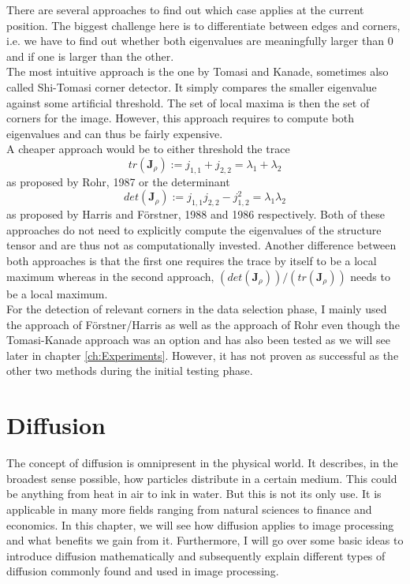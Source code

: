 There are several approaches to find out which case applies at the current position. The biggest
challenge here is to differentiate between edges and corners, i.e. we have to find out whether both
eigenvalues are meaningfully larger than 0 and if one is larger than the other.\\
The most intuitive approach is the one by Tomasi and Kanade, sometimes also called Shi-Tomasi
corner detector. It simply compares the smaller eigenvalue against some artificial
threshold. The set of local maxima is then the set of corners for the image\cite{shitomasi94}.
However, this approach requires to compute both eigenvalues and can thus be fairly expensive.\\
A cheaper approach would be to either threshold the trace \[tr(\mathbf{J}_\rho) := j_{1, 1} + j_{2,
        2} = \lambda_1 + \lambda_2\] as proposed by Rohr, 1987 or the determinant \[det(\mathbf{J}_\rho) := j_{1, 1}j_{2, 2} -
    j_{1, 2}^2 = \lambda_1\lambda_2\] as proposed by Harris and F\"orstner, 1988 and 1986
respectively\cite{harris88}. Both of these approaches do not need to explicitly compute the eigenvalues of
the structure tensor and are thus not as computationally invested. Another difference between both 
approaches is that the first one requires the trace by itself to be a local maximum whereas in the
second approach, $(det(\mathbf{J}_\rho))/(tr(\mathbf{J}_\rho))$ needs to be a local maximum.\\

For the detection of relevant corners in the data selection phase, I mainly used the approach of F\"orstner/Harris as well as
the approach of Rohr even though the Tomasi-Kanade approach was an option and has also been
tested as we will see later in chapter \ref{ch:Experiments}. However, it has not proven as successful
as the other two methods during the initial testing phase.
\section{Diffusion}\label{sec:Diffusion}
The concept of diffusion is omnipresent in the physical world. It describes, in the broadest sense
possible, how particles distribute in a certain medium. This could be anything from heat in air to
ink in water. But this is not its only use. It is applicable in many more fields ranging from
natural sciences to finance and economics. In this chapter, we will see how diffusion applies to
image processing and what benefits we gain from it. Furthermore, I will go over some basic ideas to
introduce diffusion mathematically and subsequently explain different types of diffusion commonly
found and used in image processing.
